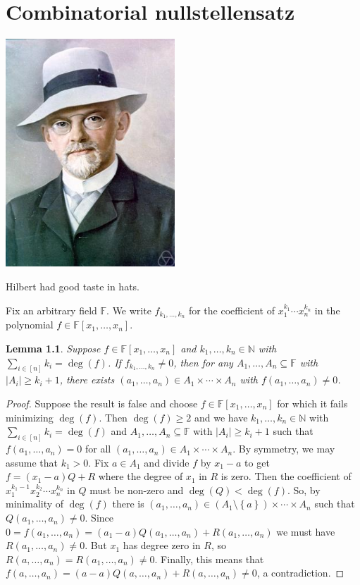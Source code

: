 \documentclass[openany]{tufte-book} %
\theoremstyle{plain}
\newtheorem{lemma}{Lemma}
\newcommand{\set}[1]{\left\{ #1 \right\}}
\newcommand{\card}[1]{\left|#1\right|}
\newcommand{\irange}[1]{\left[#1\right]}
\newcommand{\IN}{\mathbb{N}}
\begin{document}
\chapter{Combinatorial nullstellensatz}\label{combinatorialnullchapter}
\begin{marginfigure}
		\includegraphics[width=2.5in]{pictures/nicehat.jpg}
		\caption{Hilbert had good taste in hats.}
\end{marginfigure}
Fix an arbitrary field $\mathbb{F}$. We write $f_{k_1, \ldots, k_n}$ for the coefficient of $x_1^{k_1}\cdots x_n^{k_n}$ in the polynomial $f \in \mathbb{F}[x_1, \ldots, x_n]$. 
\begin{lemma}
Suppose $f \in \mathbb{F}[x_1, \ldots, x_n]$ and $k_1, \ldots, k_n \in \IN$ with $\sum_{i \in \irange{n}} k_i = \deg(f)$.  If $f_{k_1, \ldots, k_n} \ne 0$, then for any $A_1, \ldots, A_n \subseteq \mathbb{F}$ 
with $\card{A_i} \ge k_i + 1$, there exists $(a_1, \ldots, a_n) \in A_1 \times \cdots \times A_n$ with $f(a_1, \ldots, a_n) \ne 0$.
\end{lemma}
\begin{proof}
Suppose the result is false and choose $f \in \mathbb{F}[x_1, \ldots, x_n]$ for which it fails 
minimizing $\deg(f)$. Then $\deg(f) \ge 2$ and we have $k_1, \ldots, k_n \in \IN$ with $\sum_{i \in \irange{n}} k_i = \deg(f)$ and 
$A_1, \ldots, A_n \subseteq \mathbb{F}$ with $\card{A_i} \ge k_i + 1$ such that $f(a_1, \ldots, a_n) = 0$ for all $(a_1, \ldots, a_n) \in A_1 \times \cdots \times A_n$.  
By symmetry, we may assume that $k_1 > 0$.  Fix $a \in A_1$ and divide $f$ by $x_1 - a$ to get $f = (x_1 - a)Q + R$ where the degree of $x_1$ in $R$ is zero.  
Then the coefficient of $x_1^{k_1-1}x_2^{k_2} \cdots x_n^{k_n}$ in $Q$ must be non-zero and $\deg(Q) < \deg(f)$.  So, by minimality of $\deg(f)$ there 
is $(a_1, \ldots, a_n) \in (A_1 \setminus \set{a}) \times \cdots \times A_n$ such that $Q(a_1,\ldots, a_n) \ne 0$.  
Since $0 = f(a_1,\ldots, a_n) = (a_1 - a)Q(a_1,\ldots, a_n) + R(a_1,\ldots, a_n)$ we must have $R(a_1,\ldots, a_n) \ne 0$.  
But $x_1$ has degree zero in $R$, so $R(a,\ldots, a_n) = R(a_1,\ldots, a_n) \ne 0$.  
Finally, this means that $f(a,\ldots, a_n) = (a-a)Q(a,\ldots, a_n) + R(a,\ldots, a_n) \ne 0$, a contradiction.
\end{proof}
\end{document}
